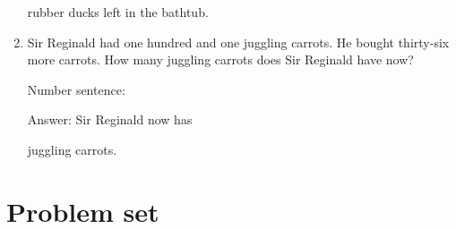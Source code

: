 \documentclass{tufte-book}
\begin{document}
\begin{enumerate}
  rubber ducks left in the bathtub.
\item
  Sir Reginald had one hundred and one juggling carrots. He bought
  thirty-six more carrots. How many juggling carrots does Sir Reginald
  have now?\medskip\par
  Number sentence:
  \dotfill\medskip\par
  Answer: Sir Reginald now has
  \dotfill\medskip\par\mbox{}\dotfill\medskip\par\mbox{}\dotfill\bigskip
  juggling carrots.
\end{enumerate}



\clearpage\section{Problem set }
\end{document}
